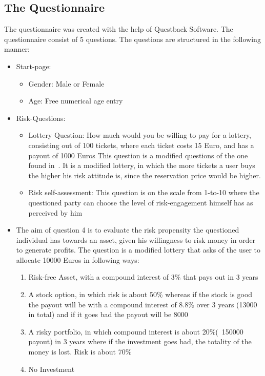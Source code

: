 \documentclass[12pt]{article}
\begin{document}
\subsection{The Questionnaire}
\label{sub:questionnaire}

The questionnaire was created with the help of Questback Software. The questionnaire consist of 5 questions. The questions are structured in the following manner:
\begin{itemize}
    \item Start-page:
        \begin{itemize}
            \item Gender: Male or Female
            \item Age: Free numerical age entry
        \end{itemize}
    \item Risk-Questions:
        \begin{itemize}
            \item Lottery Question: How much would you be willing to pay for a lottery, consisting out of 100 tickets, where each ticket costs 15 Euro, and has a payout of 1000 Euros
                This question is a modified questions of the one found in~\citep{10.1.1.558.6537.pdf}. It is a modified lottery, in which the more tickets a user buys the higher his risk attitude is, since the reservation price would be higher.
            \item Risk self-assessment: This question is on the scale from 1-to-10 where the questioned party can choose the level of risk-engagement himself has as perceived by him
        \end{itemize}
    \item The aim of question 4 is to evaluate the risk propensity the questioned individual has towards an asset, given his willingness to risk money in order to generate profits.
        The question is a modified lottery that asks of the user to allocate 10000 Euros in following ways:
        \begin{enumerate}
            \item Risk-free Asset, with a compound interest of 3\% that pays out in 3 years
            \item A stock option, in which risk is about 50\% whereas if the stock is good the payout will be with a compound interest of 8.8\% over 3 years (13000 in total) and if it goes bad the payout will be 8000 
            \item A risky portfolio, in which compound interest is about 20\%(~150000 payout) in 3 years where if the investment goes bad, the totality of the money is lost. Risk is about 70\%
            \item No Investment
        \end{enumerate}
\end{itemize}
\end{document}
